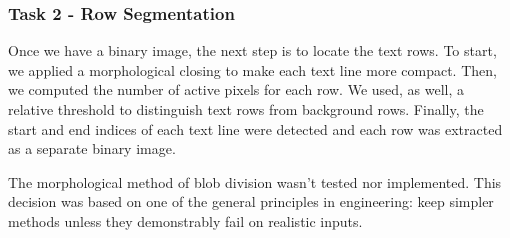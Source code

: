 \subsubsection{Task 2 - Row Segmentation}
Once we have a binary image, the next step is to locate the text rows. To start, we applied a morphological closing to make each text line more compact. Then, we computed the number of active pixels for each row. We used, as well, a relative threshold  to distinguish text rows from background rows. Finally, the start and end indices of each text line were detected and each row was extracted as a separate binary image.

\indent The morphological method of blob division wasn’t tested nor implemented. This decision was based on one of the general principles in engineering: keep simpler methods unless they demonstrably fail on realistic inputs. 
